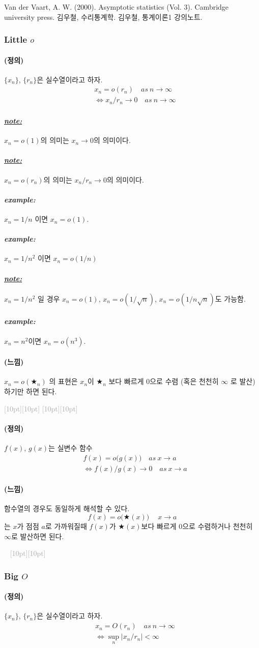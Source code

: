 \documentclass[12pt,oneside,english]{book}
\newcommand{\dash}{\vspace{2em}\noindent \textcolor{darkgray}{\hrulefill~ \raisebox{-2.5pt}[10pt][10pt]{\leafright \decofourleft \decothreeleft  \aldineright \decotwo \floweroneleft \decoone   \floweroneright \decotwo \aldineleft\decothreeright \decofourright \leafleft} ~  \hrulefill \\ \vspace{2em}}}
\newcommand{\rdash}{\noindent \textcolor{darkgray}{ \raisebox{-1.9pt}[10pt][10pt]{\leafright} \hrulefill \raisebox{-1.9pt}[10pt][10pt]{\leafright \decofourleft \decothreeleft  \aldineright \decotwo \floweroneleft \decoone}}}
\def\dfn{\paragraph{\Large(정의)}\Large}
\def\fl{\paragraph{\Large(느낌)}\Large}
\def\note{\paragraph{\Large\textit{\underline{note:}}}\Large}
\def\ex{\paragraph{\Large\textit{example:}}\Large}
\begin{document}
\begin{thebibliography}{9} 
 Van der Vaart, A. W. (2000). Asymptotic statistics (Vol. 3). Cambridge university press.
 김우철, 수리통계학.
 김우철, 통계이론1 강의노트.
\end{thebibliography}

\subsubsection{Little $o$}

\dfn $\{x_n\}$, $\{r_n\}$은 실수열이라고 하자. 
\begin{align*}
& x_n=o(r_n) \quad as~  n\to \infty \\
&\Longleftrightarrow x_n/r_n \to 0 \quad as ~ n \to \infty 
\end{align*}

\note $x_n=o(1)$의 의미는 $x_n\to 0$의 의미이다. 

\note $x_n=o(r_n)$의 의미는 $x_n/r_n \to 0$의 의미이다. 

\ex $x_n=1/n$ 이면 $x_n=o(1)$. 

\ex $x_n=1/n^2$ 이면 $x_n=o(1/n)$

\note $x_n=1/n^2$ 일 경우 $x_n=o(1)$, $x_n=o(1/\sqrt{n})$, $x_n=o(1/n\sqrt{n})$도 가능함. 

\ex $x_n=n^2$이면 $x_n=o(n^3)$. 

\fl $x_n=o(\bigstar_n)$ 의 표현은 $x_n$이 $\bigstar_n$ 보다 빠르게 $0$으로 수렴 (혹은 천천히 $\infty$ 로 발산) 하기만 하면 된다. 

\rdash

\dfn $f(x)$, $g(x)$는 실변수 함수 
\begin{align*}
& f(x)=o\big(g(x)\big) \quad as~  x\to a \\
&\Longleftrightarrow f(x)/g(x) \to 0 \quad as ~ x \to a
\end{align*}

\fl 함수열의 경우도 동일하게 해석할 수 있다. 
\[
f(x)=o\big(\bigstar(x)\big) \quad ~ x \to a
\]
는 $x$가 점점 $a$로 가까워질때 $f(x)$가 $\bigstar(x)$보다 빠르게 $0$으로 수렴하거나 천천히 $\infty$로 발산하면 된다. 

\dash

\subsubsection{Big $O$}

\dfn $\{x_n\}$, $\{r_n\}$은 실수열이라고 하자. 
\begin{align*}
& x_n=O(r_n) \quad as~  n\to \infty \\
&\Longleftrightarrow \sup_n |x_n/r_n| < \infty 
\end{align*}
\end{document}
